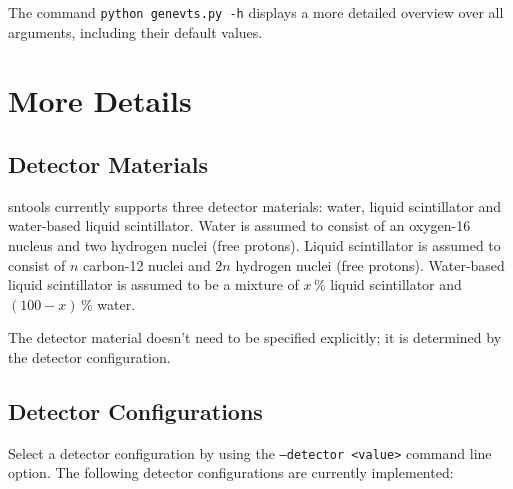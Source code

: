 \documentclass[11pt, oneside]{article}
\begin{document}
The command \texttt{python genevts.py -h} displays a more detailed overview over all arguments, including their default values.



\section{More Details}

\subsection{Detector Materials}
sntools currently supports three detector materials: water, liquid scintillator and water-based liquid scintillator.
Water is assumed to consist of an oxygen-16 nucleus and two hydrogen nuclei (free protons).
Liquid scintillator is assumed to consist of $n$ carbon-12 nuclei and $2n$ hydrogen nuclei (free protons).
Water-based liquid scintillator is assumed to be a mixture of $x\,\%$ liquid scintillator and $(100-x)\,\%$ water.

The detector material doesn’t need to be specified explicitly; it is determined by the detector configuration.


\subsection{Detector Configurations}\label{sec:detector-configurations}
Select a detector configuration by using the \texttt{--detector <value>} command line option. The following detector configurations are currently implemented:
\end{document}
